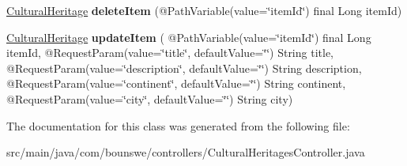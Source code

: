 \begin{DoxyCompactItemize}
\hyperlink{classcom_1_1bounswe_1_1models_1_1_cultural_heritage}{Cultural\+Heritage} {\bfseries delete\+Item} (@Path\+Variable(value=\char`\"{}item\+Id\char`\"{}) final Long item\+Id)
\item 
\mbox{\label{classcom_1_1bounswe_1_1controllers_1_1_cultural_heritages_controller_afb119a1b8434521644c8ab386b98035c}} 
\hyperlink{classcom_1_1bounswe_1_1models_1_1_cultural_heritage}{Cultural\+Heritage} {\bfseries update\+Item} ( @Path\+Variable(value=\char`\"{}item\+Id\char`\"{}) final Long item\+Id, @Request\+Param(value=\char`\"{}title\char`\"{}, default\+Value=\char`\"{}\char`\"{}) String title, @Request\+Param(value=\char`\"{}description\char`\"{}, default\+Value=\char`\"{}\char`\"{}) String description, @Request\+Param(value=\char`\"{}continent\char`\"{}, default\+Value=\char`\"{}\char`\"{}) String continent, @Request\+Param(value=\char`\"{}city\char`\"{}, default\+Value=\char`\"{}\char`\"{}) String city)
\end{DoxyCompactItemize}


The documentation for this class was generated from the following file\+:\begin{DoxyCompactItemize}
\item 
src/main/java/com/bounswe/controllers/Cultural\+Heritages\+Controller.\+java\end{DoxyCompactItemize}
